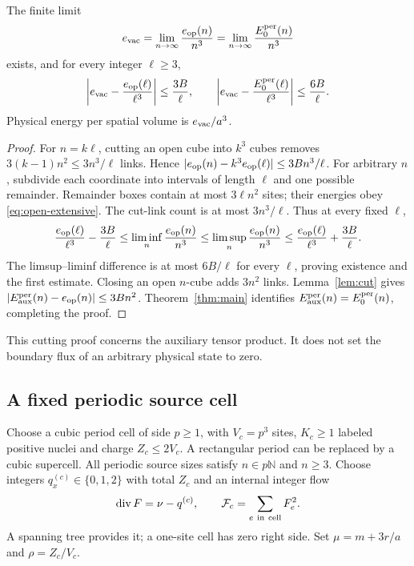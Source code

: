 \begin{theorem}
\label{thm:vacuum-limit}
The finite limit
\begin{equation}
 e_{\mathrm{vac}}=\lim_{n\to\infty}\frac{e_{\rm op}(n)}{n^3}
         =\lim_{n\to\infty}\frac{E_0^{\rm per}(n)}{n^3}
 \label{eq:vacuum-limit}
\end{equation}
exists, and for every integer $\ell\ge3$,
\begin{equation}
 \left|e_{\mathrm{vac}}-\frac{e_{\rm op}(\ell)}{\ell^3}\right|
 \le\frac{3B}{\ell},\qquad
 \left|e_{\mathrm{vac}}-\frac{E_0^{\rm per}(\ell)}{\ell^3}\right|
 \le\frac{6B}{\ell}.
 \label{eq:vacuum-rate}
\end{equation}
Physical energy per spatial volume is $e_{\mathrm{vac}}/a^3$.
\end{theorem}
\begin{proof}
For $n=k\ell$, cutting an open cube into $k^3$ cubes removes
$3(k-1)n^2\le3n^3/\ell$ links. Hence
$|e_{\rm op}(n)-k^3e_{\rm op}(\ell)|\le3Bn^3/\ell$.
For arbitrary $n$, subdivide each coordinate into intervals of
length $\ell$ and one possible remainder. Remainder boxes contain
at most $3\ell n^2$ sites; their energies obey
\eqref{eq:open-extensive}. The cut-link count is at most
$3n^3/\ell$. Thus at every fixed $\ell$,
\[
 \frac{e_{\rm op}(\ell)}{\ell^3}-\frac{3B}{\ell}
 \le\liminf_n\frac{e_{\rm op}(n)}{n^3}
 \le\limsup_n\frac{e_{\rm op}(n)}{n^3}
 \le\frac{e_{\rm op}(\ell)}{\ell^3}+\frac{3B}{\ell}.
\]
The limsup--liminf difference is at most $6B/\ell$ for every
$\ell$, proving existence and the first estimate.
Closing an open $n$-cube adds $3n^2$ links. Lemma~\ref{lem:cut}
gives $|E_{\rm aux}^{\rm per}(n)-e_{\rm op}(n)|\le3Bn^2$.
Theorem~\ref{thm:main} identifies
$E_{\rm aux}^{\rm per}(n)=E_0^{\rm per}(n)$, completing the proof.
\end{proof}

This cutting proof concerns the auxiliary tensor product.
It does not set the boundary flux of an arbitrary physical
state to zero.

\subsection{A fixed periodic source cell}

Choose a cubic period cell of side $p\ge1$, with $V_c=p^3$ sites,
$K_c\ge1$ labeled positive nuclei and charge $Z_c\le2V_c$.
A rectangular period can be replaced by a cubic supercell.
All periodic source sizes satisfy $n\in p\mathbb N$ and $n\ge3$.
Choose integers $q_x^{(c)}\in\{0,1,2\}$ with total $Z_c$
and an internal integer flow
\begin{equation}
 \operatorname{div} F=\nu-q^{(c)},\qquad
 \mathcal F_c=\sum_{e\ {\rm in\ cell}}F_e^2.
 \label{eq:cell-flow}
\end{equation}
A spanning tree provides it; a one-site cell has zero right side.
Set $\mu=m+3r/a$ and $\rho=Z_c/V_c$.

